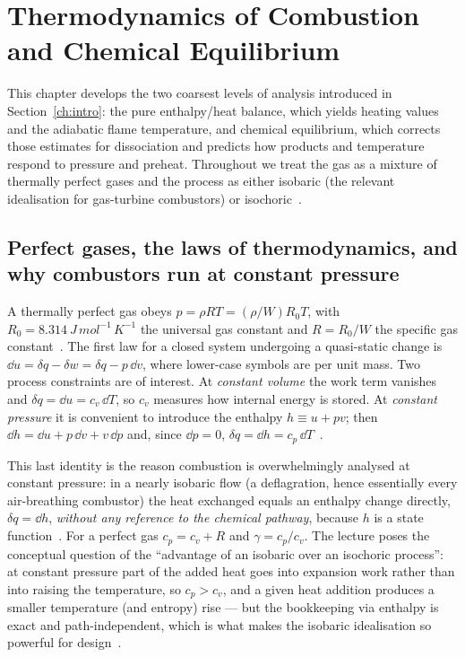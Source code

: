 \chapter{Thermodynamics of Combustion and Chemical Equilibrium}\label{ch:thermo}

This chapter develops the two coarsest levels of analysis introduced in Section~\ref{ch:intro}: the pure enthalpy/heat balance, which yields heating values and the adiabatic flame temperature, and chemical equilibrium, which corrects those estimates for dissociation and predicts how products and temperature respond to pressure and preheat. Throughout we treat the gas as a mixture of thermally perfect gases and the process as either isobaric (the relevant idealisation for gas-turbine combustors) or isochoric~\cite{lecture2,Langella_LectureNotes}.

\section{Perfect gases, the laws of thermodynamics, and why combustors run at constant pressure}

A thermally perfect gas obeys $p = \rho R T = (\rho/W) R_0 T$, with $R_0=\SI{8.314}{J\,mol^{-1}\,K^{-1}}$ the universal gas constant and $R=R_0/W$ the specific gas constant~\cite{Langella_LectureNotes}. The first law for a closed system undergoing a quasi-static change is $\dd u = \delta q - \delta w = \delta q - p\,\dd v$, where lower-case symbols are per unit mass. Two process constraints are of interest. At \emph{constant volume} the work term vanishes and $\delta q = \dd u = c_v\,\dd T$, so $c_v$ measures how internal energy is stored. At \emph{constant pressure} it is convenient to introduce the enthalpy $h \equiv u + pv$; then $\dd h = \dd u + p\,\dd v + v\,\dd p$ and, since $\dd p = 0$, $\delta q = \dd h = c_p\,\dd T$~\cite{Langella_LectureNotes,warnatz2006combustion}.

This last identity is the reason combustion is overwhelmingly analysed at constant pressure: in a nearly isobaric flow (a deflagration, hence essentially every air-breathing combustor) the heat exchanged equals an enthalpy change directly, $\delta q = \dd h$, \emph{without any reference to the chemical pathway}, because $h$ is a state function~\cite{Langella_LectureNotes}. For a perfect gas $c_p = c_v + R$ and $\gamma = c_p/c_v$. The lecture poses the conceptual question of the ``advantage of an isobaric over an isochoric process'': at constant pressure part of the added heat goes into expansion work rather than into raising the temperature, so $c_p>c_v$, and a given heat addition produces a smaller temperature (and entropy) rise --- but the bookkeeping via enthalpy is exact and path-independent, which is what makes the isobaric idealisation so powerful for design~\cite{lecture1,transcript_tutorial}.

